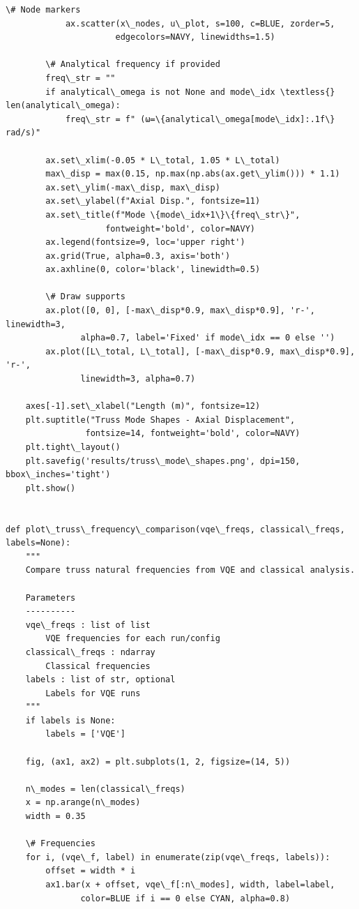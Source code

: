 \documentclass[12pt, a4paper]{article}
\begin{document}
\begin{lstlisting}[style=codestyle, caption={{visualize.py --- Beam and Truss Visualizations}}]
            \# Node markers
            ax.scatter(x\_nodes, u\_plot, s=100, c=BLUE, zorder=5,
                      edgecolors=NAVY, linewidths=1.5)

        \# Analytical frequency if provided
        freq\_str = ""
        if analytical\_omega is not None and mode\_idx \textless{} len(analytical\_omega):
            freq\_str = f" (ω=\{analytical\_omega[mode\_idx]:.1f\} rad/s)"

        ax.set\_xlim(-0.05 * L\_total, 1.05 * L\_total)
        max\_disp = max(0.15, np.max(np.abs(ax.get\_ylim())) * 1.1)
        ax.set\_ylim(-max\_disp, max\_disp)
        ax.set\_ylabel(f"Axial Disp.", fontsize=11)
        ax.set\_title(f"Mode \{mode\_idx+1\}\{freq\_str\}",
                    fontweight='bold', color=NAVY)
        ax.legend(fontsize=9, loc='upper right')
        ax.grid(True, alpha=0.3, axis='both')
        ax.axhline(0, color='black', linewidth=0.5)

        \# Draw supports
        ax.plot([0, 0], [-max\_disp*0.9, max\_disp*0.9], 'r-', linewidth=3,
               alpha=0.7, label='Fixed' if mode\_idx == 0 else '')
        ax.plot([L\_total, L\_total], [-max\_disp*0.9, max\_disp*0.9], 'r-',
               linewidth=3, alpha=0.7)

    axes[-1].set\_xlabel("Length (m)", fontsize=12)
    plt.suptitle("Truss Mode Shapes - Axial Displacement",
                fontsize=14, fontweight='bold', color=NAVY)
    plt.tight\_layout()
    plt.savefig('results/truss\_mode\_shapes.png', dpi=150, bbox\_inches='tight')
    plt.show()


def plot\_truss\_frequency\_comparison(vqe\_freqs, classical\_freqs, labels=None):
    """
    Compare truss natural frequencies from VQE and classical analysis.

    Parameters
    ----------
    vqe\_freqs : list of list
        VQE frequencies for each run/config
    classical\_freqs : ndarray
        Classical frequencies
    labels : list of str, optional
        Labels for VQE runs
    """
    if labels is None:
        labels = ['VQE']

    fig, (ax1, ax2) = plt.subplots(1, 2, figsize=(14, 5))

    n\_modes = len(classical\_freqs)
    x = np.arange(n\_modes)
    width = 0.35

    \# Frequencies
    for i, (vqe\_f, label) in enumerate(zip(vqe\_freqs, labels)):
        offset = width * i
        ax1.bar(x + offset, vqe\_f[:n\_modes], width, label=label,
               color=BLUE if i == 0 else CYAN, alpha=0.8)


\end{lstlisting}
\end{document}
